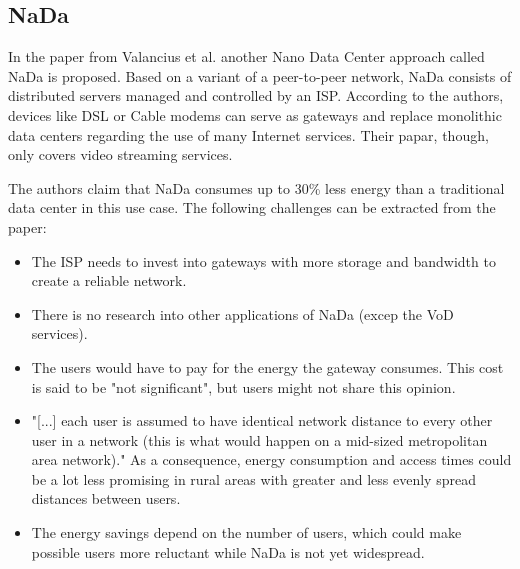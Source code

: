 \subsection{NaDa}
In the paper from Valancius et al. \cite{DBLP:conf/conext/ValanciusLMDR09} another Nano Data Center approach called NaDa is proposed. Based on a variant of a peer-to-peer network, NaDa consists of distributed servers managed and controlled by an ISP. According to the authors, devices like DSL or Cable modems can serve as gateways and replace monolithic data centers regarding the use of many Internet services. Their papar, though, only covers video streaming services. 

The authors claim that NaDa consumes up to 30\% less energy than a traditional data center in this use case. The following challenges can be extracted from the paper:

\begin{itemize}
	\item The ISP needs to invest into gateways with more storage and bandwidth to create a reliable network.
	\item There is no research into other applications of NaDa (excep the VoD services).
	\item The users would have to pay for the energy the gateway consumes. This cost is said to be "not significant", but users might not share this opinion.
	\item "[...] each user is assumed to have identical network distance to every other user in a network (this is what would happen on a mid-sized metropolitan area network)." As a consequence, energy consumption and access times could be a lot less promising in rural areas with greater and less evenly spread distances between users. 
	\item The energy savings depend on the number of users, which could make possible users more reluctant while NaDa is not yet widespread.
\end{itemize}